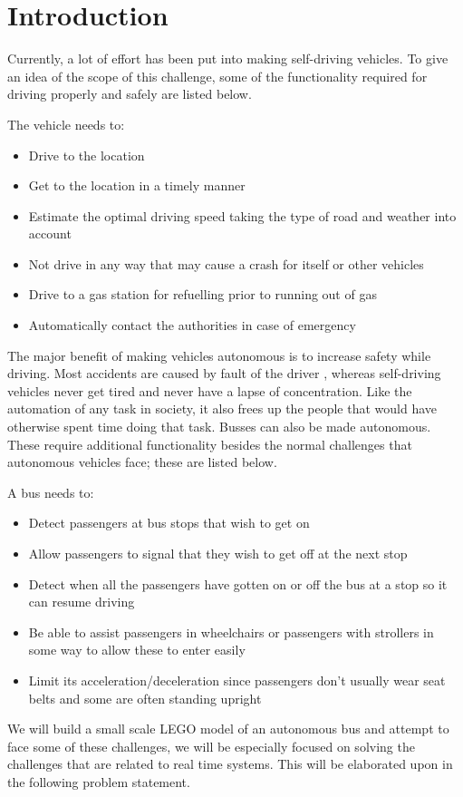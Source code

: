 \chapter{Introduction}

Currently, a lot of effort has been put into making self-driving vehicles. To give an idea of the scope of this challenge, some of the functionality required for driving properly and safely are listed below.

The vehicle needs to:
\begin{itemize}
\item Drive to the location
\item Get to the location in a timely manner
\item Estimate the optimal driving speed taking the type of road and weather into account
\item Not drive in any way that may cause a crash for itself or other vehicles
\item Drive to a gas station for refuelling prior to running out of gas
\item Automatically contact the authorities in case of emergency
\end{itemize}

The major benefit of making vehicles autonomous is to increase safety while driving. Most accidents are caused by fault of the driver \cite{baddriver}, whereas self-driving vehicles never get tired and never have a lapse of concentration. Like the automation of any task in society, it also frees up the people that would have otherwise spent time doing that task. Busses can also be made autonomous. These require additional functionality besides the normal challenges that autonomous vehicles face; these are listed below.

A bus needs to:
\begin{itemize}
\item Detect passengers at bus stops that wish to get on
\item Allow passengers to signal that they wish to get off at the next stop
\item Detect when all the passengers have gotten on or off the bus at a stop so it can resume driving
\item Be able to assist passengers in wheelchairs or passengers with strollers in some way to allow these to enter easily
\item Limit its acceleration/deceleration since passengers don't usually wear seat belts and some are often standing upright
\end{itemize}

We will build a small scale LEGO model of an autonomous bus and attempt to face some of these challenges, we will be especially focused on solving the challenges that are related to real time systems. This will be elaborated upon in the following problem statement. 